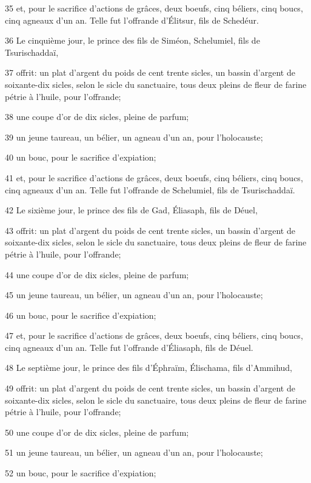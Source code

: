 \par 35 et, pour le sacrifice d'actions de grâces, deux boeufs, cinq béliers, cinq boucs, cinq agneaux d'un an. Telle fut l'offrande d'Élitsur, fils de Schedéur.
\par 36 Le cinquième jour, le prince des fils de Siméon, Schelumiel, fils de Tsurischaddaï,
\par 37 offrit: un plat d'argent du poids de cent trente sicles, un bassin d'argent de soixante-dix sicles, selon le sicle du sanctuaire, tous deux pleins de fleur de farine pétrie à l'huile, pour l'offrande;
\par 38 une coupe d'or de dix sicles, pleine de parfum;
\par 39 un jeune taureau, un bélier, un agneau d'un an, pour l'holocauste;
\par 40 un bouc, pour le sacrifice d'expiation;
\par 41 et, pour le sacrifice d'actions de grâces, deux boeufs, cinq béliers, cinq boucs, cinq agneaux d'un an. Telle fut l'offrande de Schelumiel, fils de Tsurischaddaï.
\par 42 Le sixième jour, le prince des fils de Gad, Éliasaph, fils de Déuel,
\par 43 offrit: un plat d'argent du poids de cent trente sicles, un bassin d'argent de soixante-dix sicles, selon le sicle du sanctuaire, tous deux pleins de fleur de farine pétrie à l'huile, pour l'offrande;
\par 44 une coupe d'or de dix sicles, pleine de parfum;
\par 45 un jeune taureau, un bélier, un agneau d'un an, pour l'holocauste;
\par 46 un bouc, pour le sacrifice d'expiation;
\par 47 et, pour le sacrifice d'actions de grâces, deux boeufs, cinq béliers, cinq boucs, cinq agneaux d'un an. Telle fut l'offrande d'Éliasaph, fils de Déuel.
\par 48 Le septième jour, le prince des fils d'Éphraïm, Élischama, fils d'Ammihud,
\par 49 offrit: un plat d'argent du poids de cent trente sicles, un bassin d'argent de soixante-dix sicles, selon le sicle du sanctuaire, tous deux pleins de fleur de farine pétrie à l'huile, pour l'offrande;
\par 50 une coupe d'or de dix sicles, pleine de parfum;
\par 51 un jeune taureau, un bélier, un agneau d'un an, pour l'holocauste;
\par 52 un bouc, pour le sacrifice d'expiation;
